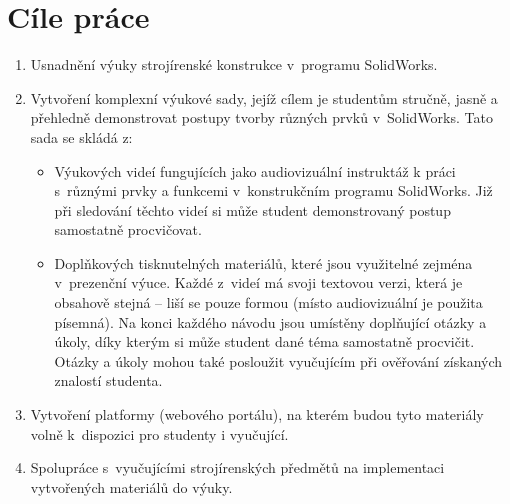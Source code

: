 \chapter{Cíle práce}

\begin{enumerate}[topsep=0pt]
    \setlength\itemsep{0em}
    \item Usnadnění výuky strojírenské konstrukce v~programu SolidWorks.
    \item Vytvoření komplexní výukové sady, jejíž cílem je studentům stručně, jasně a přehledně demonstrovat postupy tvorby různých prvků v~SolidWorks. Tato sada se skládá z:
    \begin{itemize}[topsep=0pt]
        \setlength\itemsep{0em}
        \item Výukových videí fungujících jako audiovizuální instruktáž k práci s~různými prvky a funkcemi v~konstrukčním programu SolidWorks. Již při sledování těchto videí si může student demonstrovaný postup samostatně procvičovat. 
        \item Doplňkových tisknutelných materiálů, které jsou využitelné zejména v~prezenční výuce. Každé z~videí má svoji textovou verzi, která je obsahově stejná -- liší se pouze formou (místo audiovizuální je použita písemná). Na konci každého návodu jsou umístěny doplňující otázky a úkoly, díky kterým si může student dané téma samostatně procvičit. Otázky a úkoly mohou také posloužit vyučujícím při ověřování získaných znalostí studenta. 
    \end{itemize}
    \item Vytvoření platformy (webového portálu), na kterém budou tyto materiály volně k~dispozici pro studenty i vyučující.
    \item Spolupráce s~vyučujícími strojírenských předmětů na implementaci vytvořených materiálů do výuky.
\end{enumerate}
